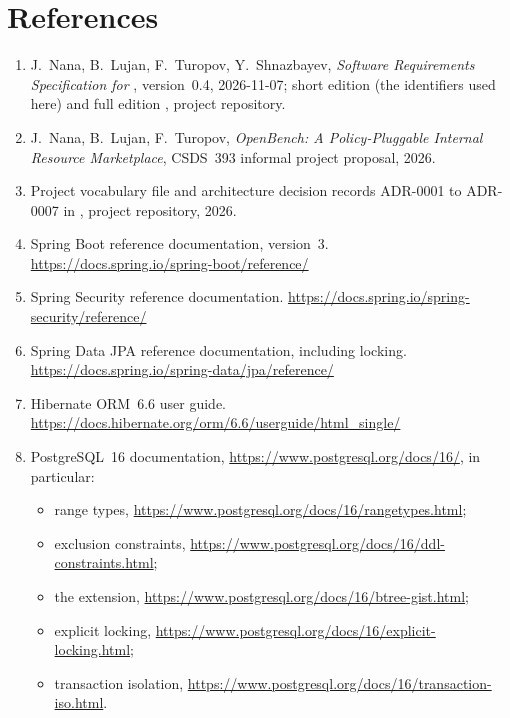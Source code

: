 \section{References}\label{sec:refs}

{\sloppy
\begin{enumerate}
  \item J.~Nana, B.~Lujan, F.~Turopov, Y.~Shnazbayev, \emph{Software Requirements Specification for \SRSproduct{}}, version~0.4, 2026-11-07; short edition  (the identifiers used here) and full edition , project repository.
  \item J.~Nana, B.~Lujan, F.~Turopov, \emph{OpenBench: A Policy-Pluggable Internal Resource Marketplace}, CSDS~393 informal project proposal, 2026.
  \item Project vocabulary file  and architecture decision records ADR-0001 to ADR-0007 in , project repository, 2026.
  \item Spring Boot reference documentation, version~3. \url{https://docs.spring.io/spring-boot/reference/}
  \item Spring Security reference documentation. \url{https://docs.spring.io/spring-security/reference/}
  \item Spring Data JPA reference documentation, including locking. \url{https://docs.spring.io/spring-data/jpa/reference/}
  \item Hibernate ORM~6.6 user guide. \url{https://docs.hibernate.org/orm/6.6/userguide/html_single/}
  \item PostgreSQL~16 documentation, \url{https://www.postgresql.org/docs/16/}, in particular:
  \begin{itemize}
    \item range types, \url{https://www.postgresql.org/docs/16/rangetypes.html};
    \item exclusion constraints, \url{https://www.postgresql.org/docs/16/ddl-constraints.html};
    \item the  extension, \url{https://www.postgresql.org/docs/16/btree-gist.html};
    \item explicit locking, \url{https://www.postgresql.org/docs/16/explicit-locking.html};
    \item transaction isolation, \url{https://www.postgresql.org/docs/16/transaction-iso.html}.
  \end{itemize}

\end{enumerate}}
